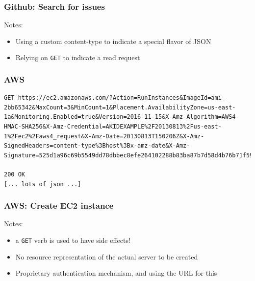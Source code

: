 \documentclass[8pt]{article}
\begin{document}
\subsubsection{Github: Search for issues}
\label{sec:orgb7f4983}
Notes:

\begin{itemize}
\item Using a custom content-type to indicate a special flavor of JSON
\item Relying on \texttt{GET} to indicate a read request
\end{itemize}
\subsubsection{AWS}
\label{sec:org1c68e8d}
\begin{verbatim}
GET https://ec2.amazonaws.com/?Action=RunInstances&ImageId=ami-2bb65342&MaxCount=3&MinCount=1&Placement.AvailabilityZone=us-east-1a&Monitoring.Enabled=true&Version=2016-11-15&X-Amz-Algorithm=AWS4-HMAC-SHA256&X-Amz-Credential=AKIDEXAMPLE%2F20130813%2Fus-east-1%2Fec2%2Faws4_request&X-Amz-Date=20130813T150206Z&X-Amz-SignedHeaders=content-type%3Bhost%3Bx-amz-date&X-Amz-Signature=525d1a96c69b5549dd78dbbec8efe264102288b83ba87b7d58d4b76b71f59fd2

200 OK
[... lots of json ...]
\end{verbatim}

\subsubsection{AWS: Create EC2 instance}
\label{sec:orgbcab71f}
Notes:

\begin{itemize}
\item a \texttt{GET} verb is used to have side effects!
\item No resource representation of the actual server to be created
\item Proprietary authentication mechanism, and using the URL for this
\end{itemize}
\end{document}
